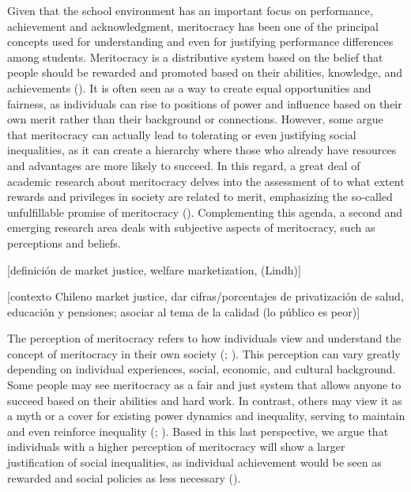 \documentclass[
  letterpaper,
  DIV=11,
  numbers=noendperiod]{scrartcl}
\begin{document}
Given that the school environment has an important focus on performance,
achievement and acknowledgment, meritocracy has been one of the
principal concepts used for understanding and even for justifying
performance differences among students. Meritocracy is a distributive
system based on the belief that people should be rewarded and promoted
based on their abilities, knowledge, and achievements
(). It is often seen as a way
to create equal opportunities and fairness, as individuals can rise to
positions of power and influence based on their own merit rather than
their background or connections. However, some argue that meritocracy
can actually lead to tolerating or even justifying social inequalities,
as it can create a hierarchy where those who already have resources and
advantages are more likely to succeed. In this regard, a great deal of
academic research about meritocracy delves into the assessment of to
what extent rewards and privileges in society are related to merit,
emphasizing the so-called unfulfillable promise of meritocracy
(). Complementing this
agenda, a second and emerging research area deals with subjective
aspects of meritocracy, such as perceptions and beliefs.

{[}definición de market justice, welfare marketization, (Lindh){]}

{[}contexto Chileno market justice, dar cifras/porcentajes de
privatización de salud, educación y pensiones; asociar al tema de la
calidad (lo público es peor){]}

The perception of meritocracy refers to how individuals view and
understand the concept of meritocracy in their own society
(;
). This
perception can vary greatly depending on individual experiences, social,
economic, and cultural background. Some people may see meritocracy as a
fair and just system that allows anyone to succeed based on their
abilities and hard work. In contrast, others may view it as a myth or a
cover for existing power dynamics and inequality, serving to maintain
and even reinforce inequality
(;
). Based in this last
perspective, we argue that individuals with a higher perception of
meritocracy will show a larger justification of social inequalities, as
individual achievement would be seen as rewarded and social policies as
less necessary ().
\end{document}
